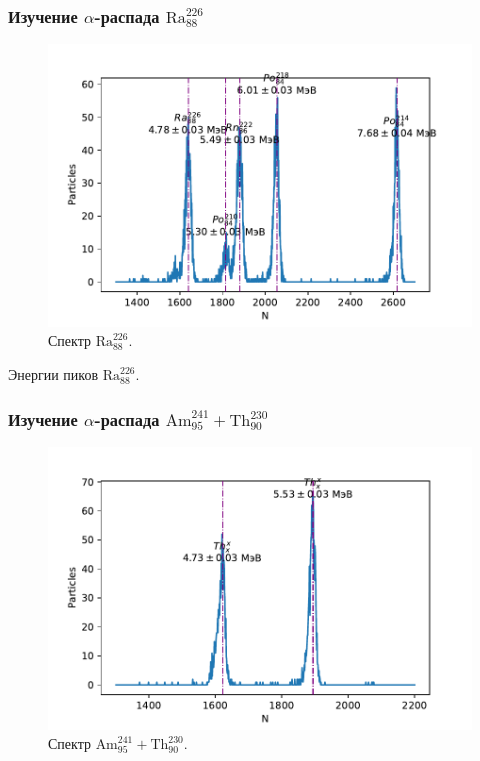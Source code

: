 \documentclass[10pt,a4paper]{article}
\begin{document}
\begin{multicols}{2}
	\subsubsection*{Изучение $\alpha$-распада $\text{Ra}_{88}^{226}$}
	
	\begin{figure}[H]
		\includegraphics[width=1\textwidth]{gen/fig-ra.pdf}
		\caption{Спектр $\text{Ra}_{88}^{226}$.}
		\label{fig:ra}
	\end{figure}
	
	\begin{table}[H]
		\addtolength{\tabcolsep}{-4pt}
		\footnotesize
		
		\caption{Энергии пиков $\text{Ra}_{88}^{226}$.}
		\label{tab:term}
	\end{table}


	\subsubsection*{Изучение $\alpha$-распада $\text{Am}_{95}^{241} + \text{Th}_{90}^{230}$}

	\begin{figure}[H]
		\includegraphics[width=1\textwidth]{gen/fig-th_am.pdf}
		\caption{Спектр $\text{Am}_{95}^{241} + \text{Th}_{90}^{230}$.}
		\label{fig:th_am}
	\end{figure}
	

\end{multicols}
\end{document}
